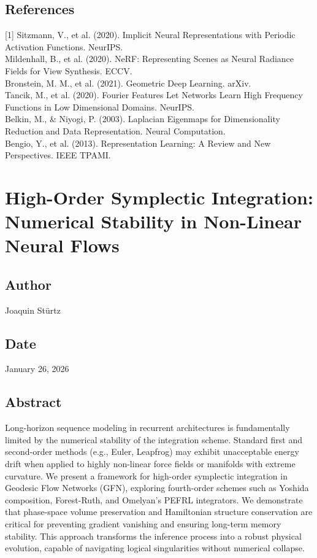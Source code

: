 \documentclass{article}
\numberwithin{equation}{section}
\begin{document}
\subsection*{References}
[1] Sitzmann, V., et al. (2020). Implicit Neural Representations with Periodic Activation Functions. NeurIPS.\\
[2] Mildenhall, B., et al. (2020). NeRF: Representing Scenes as Neural Radiance Fields for View Synthesis. ECCV.\\
[3] Bronstein, M. M., et al. (2021). Geometric Deep Learning. arXiv.\\
[4] Tancik, M., et al. (2020). Fourier Features Let Networks Learn High Frequency Functions in Low Dimensional Domains. NeurIPS.\\
[5] Belkin, M., \& Niyogi, P. (2003). Laplacian Eigenmaps for Dimensionality Reduction and Data Representation. Neural Computation.\\
[6] Bengio, Y., et al. (2013). Representation Learning: A Review and New Perspectives. IEEE TPAMI.

\section{High-Order Symplectic Integration: Numerical Stability in Non-Linear Neural Flows}
\subsection*{Author}
Joaquin Stürtz
\subsection*{Date}
January 26, 2026
\subsection*{Abstract}
Long-horizon sequence modeling in recurrent architectures is fundamentally limited by the numerical stability of the integration scheme. Standard first and second-order methods (e.g., Euler, Leapfrog) may exhibit unacceptable energy drift when applied to highly non-linear force fields or manifolds with extreme curvature. We present a framework for high-order symplectic integration in Geodesic Flow Networks (GFN), exploring fourth-order schemes such as Yoshida composition, Forest-Ruth, and Omelyan's PEFRL integrators. We demonstrate that phase-space volume preservation and Hamiltonian structure conservation are critical for preventing gradient vanishing and ensuring long-term memory stability. This approach transforms the inference process into a robust physical evolution, capable of navigating logical singularities without numerical collapse.
\end{document}
